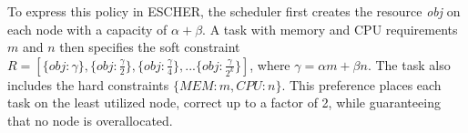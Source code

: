 To express this policy in ESCHER, the scheduler first creates the resource \textit{obj} on each node with a capacity of $\alpha+\beta$.
A task with memory and CPU requirements $m$ and $n$ then specifies the soft constraint $R = [\{obj: \gamma\}, \{obj: \frac{\gamma}{2}\}, \{obj: \frac{\gamma}{4}\},... \{obj: \frac{\gamma}{2^k}\}]$, where $\gamma = \alpha m + \beta n$.
The task also includes the hard constraints $\{MEM: m, CPU: n\}$.
This preference places each task on the least utilized node, correct up to a factor of 2, while guaranteeing that no node is overallocated.





